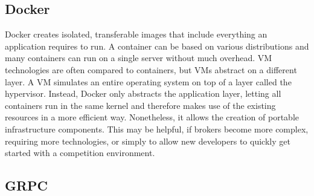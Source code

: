 
\subsection{Docker}
\label{sub:docker}

Docker creates isolated, transferable images that include everything an application requires to run. A
container can be based on various distributions and many containers can run on a single server without much overhead.
\ac{VM} technologies are often compared to containers, but \ac{VM}s abstract on a different layer. A \ac{VM} simulates
an entire operating system on top of a layer called the hypervisor. Instead, Docker only abstracts the
application layer, letting all containers run in the same kernel and therefore makes use of the existing resources in a
more efficient way. Nonetheless, it allows the creation of portable infrastructure components. This may be helpful, if
brokers become more complex, requiring more technologies, or simply to allow new developers to quickly get started with
a competition environment.

\subsection{\ac{GRPC}}%
\label{sub:grpc}

